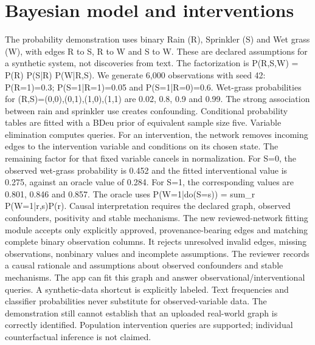 \documentclass[conference]{IEEEtran}
\begin{document}
\section{Bayesian model and interventions}
The probability demonstration uses binary Rain (R), Sprinkler (S) and Wet grass (W), with edges R to S, R to W and S to W. These are declared assumptions for a synthetic system, not discoveries from text. The factorization is P(R,S,W) = P(R) P(S|R) P(W|R,S). We generate 6,000 observations with seed 42: P(R=1)=0.3; P(S=1|R=1)=0.05 and P(S=1|R=0)=0.6. Wet-grass probabilities for (R,S)=(0,0),(0,1),(1,0),(1,1) are 0.02, 0.8, 0.9 and 0.99. The strong association between rain and sprinkler use creates confounding. Conditional probability tables are fitted with a BDeu prior of equivalent sample size five. Variable elimination computes queries. For an intervention, the network removes incoming edges to the intervention variable and conditions on its chosen state. The remaining factor for that fixed variable cancels in normalization. For S=0, the observed wet-grass probability is 0.452 and the fitted interventional value is 0.275, against an oracle value of 0.284. For S=1, the corresponding values are 0.801, 0.846 and 0.857. The oracle uses P(W=1|do(S=s)) = sum\_r P(W=1|r,s)P(r). Causal interpretation requires the declared graph, observed confounders, positivity and stable mechanisms. The new reviewed-network fitting module accepts only explicitly approved, provenance-bearing edges and matching complete binary observation columns. It rejects unresolved invalid edges, missing observations, nonbinary values and incomplete assumptions. The reviewer records a causal rationale and assumptions about observed confounders and stable mechanisms. The app can fit this graph and answer observational/interventional queries. A synthetic-data shortcut is explicitly labeled. Text frequencies and classifier probabilities never substitute for observed-variable data. The demonstration still cannot establish that an uploaded real-world graph is correctly identified. Population intervention queries are supported; individual counterfactual inference is not claimed.
\end{document}
